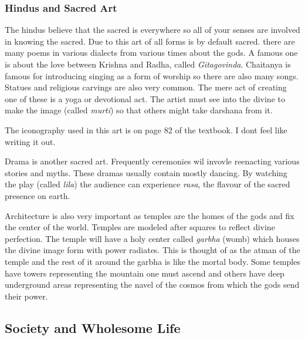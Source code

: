 \documentclass{article}
\begin{document}
\subsubsection{Hindus and Sacred Art}
\label{ssub:hindus_and_sacred_art}
The hindus believe that the sacred is everywhere so all of your senses are involved in knowing the sacred. Due to this art of all forms is by default sacred. there are many poems in various dialects from various times about the gods. A famous one is about the love between Krishna and Radha, called \emph{Gitagovinda}. Chaitanya is famous for introducing singing as a form of worship so there are also many songs. Statues and religious carvings are also very common. The mere act of creating one of these is a yoga or devotional act. The artist must see into the divine to make the image (called \emph{murti}) so that others might take darshana from it.

The iconography used in this art is on page 82 of the textbook. I dont feel like writing it out.

Drama is another sacred art. Frequently ceremonies wil invovle reenacting various stories and myths. These dramas usually contain mostly dancing. By watching the play (called \emph{lila}) the audience can experience \emph{rasa}, the flavour of the sacred presence on earth.

Architecture is also very important as temples are the homes of the gods and fix the center of the world. Temples are modeled after squares to reflect divine perfection. The temple will have a holy center called \emph{garbha} (womb) which houses the divine image form with power radiates. This is thought of as the atman of the temple and the rest of it around the garbha is like the mortal body. Some temples have towers representing the mountain one must ascend and others have deep underground areas representing the navel of the cosmos from which the gods send their power.

\subsection{Society and Wholesome Life}
\label{sub:society_and_wholesome_life}
\end{document}
